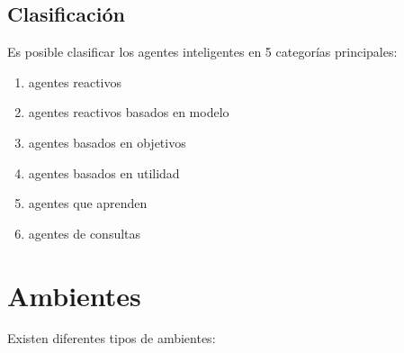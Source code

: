 \documentclass[a4paper,12pt,oneside]{book}
\begin{document}
\subsection{Clasificación}
Es posible clasificar los agentes inteligentes en 5 categorías principales:
\begin{enumerate} 
 \item agentes reactivos
 \item agentes reactivos basados en modelo
 \item agentes basados en objetivos
 \item agentes basados en utilidad
 \item agentes que aprenden
 \item agentes de consultas
\end{enumerate}


\section{Ambientes}
Existen diferentes tipos de ambientes:
\end{document}
